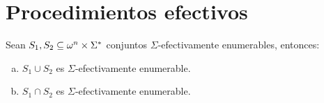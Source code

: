 \section{Procedimientos efectivos}

  \begin{lemma}
    \par Sean $S_{1}, S_{2} \subseteq \omega^{n} \times \Sigma^{\ast}$ conjuntos $\Sigma$-efectivamente enumerables, entonces:

    \begin{enumerate}[a)]
      \item $S_{1} \cup S_{2}$ es $\Sigma$-efectivamente enumerable.
      \item $S_{1} \cap S_{2}$ es $\Sigma$-efectivamente enumerable.
    \end{enumerate}
  \end{lemma}
